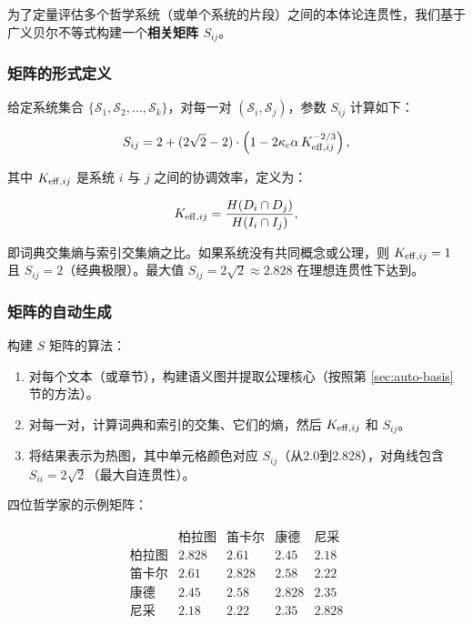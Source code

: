 \documentclass[11pt,a4paper]{article}
\newcommand{\kappac}{\kappa_c}
\begin{document}
	为了定量评估多个哲学系统（或单个系统的片段）之间的本体论连贯性，我们基于广义贝尔不等式构建一个\textbf{相关矩阵 \(S_{ij}\)}。
	
	\subsubsection{矩阵的形式定义}
	
	给定系统集合 \(\{\mathcal{S}_1, \mathcal{S}_2, \dots, \mathcal{S}_k\}\)，对每一对 \((\mathcal{S}_i, \mathcal{S}_j)\)，参数 \(S_{ij}\) 计算如下：
	
	\[
	S_{ij} = 2 + (2\sqrt{2} - 2) \cdot \left(1 - 2\kappac \alpha \, \Keff[ij]^{-2/3}\right),
	\]
	
	其中 \(\Keff[ij]\) 是系统 \(i\) 与 \(j\) 之间的协调效率，定义为：
	
	\[
	\Keff[ij] = \frac{H(D_i \cap D_j)}{H(I_i \cap I_j)},
	\]
	
	即词典交集熵与索引交集熵之比。如果系统没有共同概念或公理，则 \(\Keff[ij] = 1\) 且 \(S_{ij} = 2\)（经典极限）。最大值 \(S_{ij} = 2\sqrt{2} \approx 2.828\) 在理想连贯性下达到。
	
	\subsubsection{矩阵的自动生成}
	
	构建 \(S\) 矩阵的算法：
	
	\begin{enumerate}
		\item 对每个文本（或章节），构建语义图并提取公理核心（按照第 \ref{sec:auto-basis} 节的方法）。
		\item 对每一对，计算词典和索引的交集、它们的熵，然后 \(\Keff[ij]\) 和 \(S_{ij}\)。
		\item 将结果表示为热图，其中单元格颜色对应 \(S_{ij}\)（从2.0到2.828），对角线包含 \(S_{ii} = 2\sqrt{2}\)（最大自连贯性）。
	\end{enumerate}
	
	四位哲学家的示例矩阵：
	
	\[
	\begin{array}{c|cccc}
		& \text{柏拉图} & \text{笛卡尔} & \text{康德} & \text{尼采} \\
		\hline
		\text{柏拉图} & 2.828 & 2.61 & 2.45 & 2.18 \\
		\text{笛卡尔} & 2.61 & 2.828 & 2.58 & 2.22 \\
		\text{康德}   & 2.45 & 2.58 & 2.828 & 2.35 \\
		\text{尼采}  & 2.18 & 2.22 & 2.35 & 2.828 \\
	\end{array}
	\]
	
\end{document}
